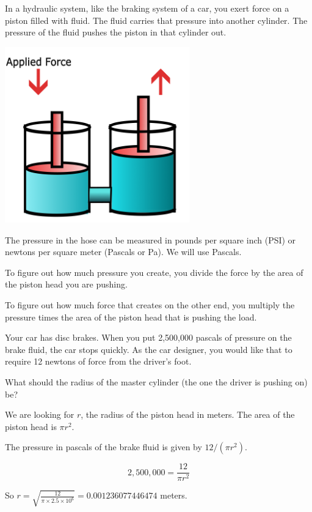 In a hydraulic system, like the braking system of a car, you exert
force on a piston filled with fluid. The fluid carries that pressure
into another cylinder. The pressure of the fluid pushes the piston in
that cylinder out.

\includegraphics[width=0.6\textwidth]{hydraulics.png}


The pressure in the hose can be measured in pounds per square inch
(PSI) or newtons per square meter (Pascals or Pa). We will use Pascals.

To figure out how much pressure you create, you divide the force by
the area of the piston head you are pushing.

To figure out how much force that creates on the other end, you
multiply the pressure times the area of the piston head that is
pushing the load.

\begin{Exercise}[title={Hydraulics}, label=hydraulics]

Your car has disc brakes. When you put 2,500,000 pascals of pressure on the
brake fluid, the car stops quickly. As the car designer, you would like
that to require 12 newtons of force from the driver's foot.

What should the radius of the master cylinder (the one the driver is pushing on) be?
\end{Exercise}
\begin{Answer}[ref=hydraulics]
  We are looking for $r$, the radius of the piston head in meters. The area of the piston head is $\pi r^2$.

  The pressure in pascals of the brake fluid is given by $12 / (\pi r^2)$.

  $$2,500,000 = \frac{12}{\pi r^2}$$

  So $r = \sqrt{\frac{12}{\pi \times 2.5 \times 10^6}} = 0.001236077446474$ meters.

\end{Answer}


